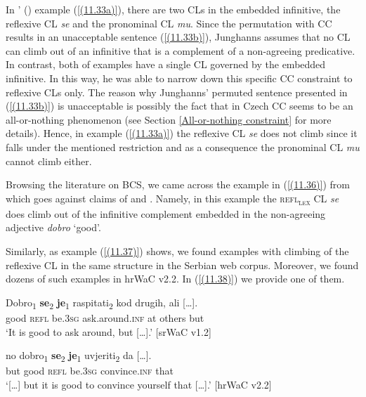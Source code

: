 \noindent In \citeauthor{Junghanns02}' (\citeyear[77]{Junghanns02}) example (\ref{(11.33a)}), there are two CLs in the embedded infinitive, the reflexive CL \textit{se} and the pronominal CL \textit{mu}. Since the permutation with CC results in an unacceptable sentence (\ref{(11.33b)}), Junghanns assumes that no CL can climb out of an infinitive that is a complement of a non-agreeing predicative. In contrast, both of \citet[82]{Dotlacil04} examples have a single CL governed by the embedded infinitive. In this way, he was able to narrow down this specific CC constraint to reflexive CLs only. The reason why Junghanns’ permuted sentence presented in (\ref{(11.33b)}) is unacceptable is possibly the fact that in Czech CC seems to be an all-or-nothing phenomenon (see Section \ref{All-or-nothing constraint} for more details). Hence, in example (\ref{(11.33a)}) the reflexive CL \textit{se} does not climb since it falls under the mentioned restriction and as a consequence the pronominal CL \textit{mu} cannot climb either. 

Browsing the literature on BCS, we came across the example in (\ref{(11.36)}) from \citet[564]{Ridjanovic12} which goes against claims of \citet[77]{Junghanns02} and \citet[82]{Dotlacil04}. Namely, in this example the \textsc{refl\textsubscript{lex}} CL \textit{se} does climb out of the infinitive complement embedded in the non-agreeing adjective \textit{dobro} ‘good’. 


\noindent Similarly, as example (\ref{(11.37)}) shows, we found examples with climbing of the reflexive CL in the same structure in the Serbian web corpus. Moreover, we found dozens of such examples in hrWaC v2.2. In (\ref{(11.38)}) we provide one of them.

\begin{exe}\ex\label{(11.37)}
\gll Dobro\textsubscript{1} \textbf{se}\textsubscript{2} \textbf{je}\textsubscript{1} raspitati\textsubscript{2} kod drugih, {ali [\dots].} \\
 good \textsc{refl} be.3\textsc{sg} ask.around.\textsc{inf} at others but \\
\glt ‘It is good to ask around, but [\dots].’
\hfill [srWaC v1.2] 

\ex\label{(11.38)}
\gll [\dots] no dobro\textsubscript{1} \textbf{se}\textsubscript{2} \textbf{je}\textsubscript{1} uvjeriti\textsubscript{2} {da [\dots].} \\
 {} but good \textsc{refl} be.3\textsc{sg} convince.\textsc{inf} that \\
\glt ‘[\dots] but it is good to convince yourself that [\dots].’
\hfill [hrWaC v2.2]
\end{exe}

